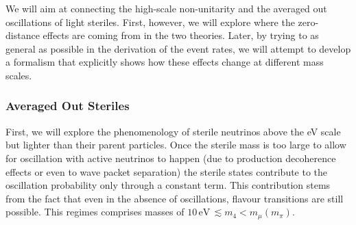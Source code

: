 We will aim at connecting the high-scale non-unitarity and the averaged out oscillations of light steriles. First, however, we will explore where the zero-distance effects are coming from in the two theories. Later, by trying to as general as possible in the derivation of the event rates, we will attempt to develop a formalism that explicitly shows how these effects change at different mass scales. 


\subsubsection{Averaged Out Steriles}

First, we will explore the phenomenology of sterile neutrinos above the eV scale but lighter than their parent particles. Once the sterile mass is too large to allow for oscillation with active neutrinos to happen (due to production decoherence effects or even to wave packet separation) the sterile states contribute to the oscillation probability only through a constant term. This contribution stems from the fact that even in the absence of oscillations, flavour transitions are still possible. This regimes comprises masses of $10 \, \text{eV}\, \lesssim m_{4} < m_{\mu} (m_{\pi}) $. 

